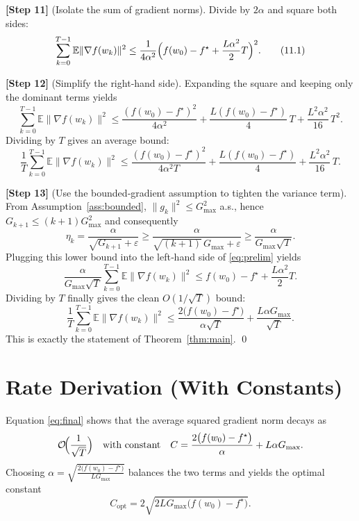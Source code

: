 \documentclass{article}
\begin{document}
\noindent\textbf{[Step 11]} (Isolate the sum of gradient norms).  
Divide by $2\alpha$ and square both sides:
\[
\sum_{k=0}^{T-1}\mathbb{E}\|\nabla f(w_k)\|^{2}
\le
\frac{1}{4\alpha^{2}}\Bigl(f(w_0)-f^{\star}
+\frac{L\alpha^{2}}{2}T\Bigr)^{2}.
\tag{11.1}
\]

\noindent\textbf{[Step 12]} (Simplify the right‑hand side).  
Expanding the square and keeping only the dominant terms yields
\[
\sum_{k=0}^{T-1}\mathbb{E}\|\nabla f(w_k)\|^{2}
\le
\frac{(f(w_0)-f^{\star})^{2}}{4\alpha^{2}}
+\frac{L(f(w_0)-f^{\star})}{4}\,T
+\frac{L^{2}\alpha^{2}}{16}\,T^{2}.
\]
Dividing by $T$ gives an average bound:
\[
\frac{1}{T}\sum_{k=0}^{T-1}\mathbb{E}\|\nabla f(w_k)\|^{2}
\le
\frac{(f(w_0)-f^{\star})^{2}}{4\alpha^{2}T}
+\frac{L(f(w_0)-f^{\star})}{4}
+\frac{L^{2}\alpha^{2}}{16}\,T .
\]

\noindent\textbf{[Step 13]} (Use the bounded‑gradient assumption to tighten the variance term).  
From Assumption~\ref{ass:bounded},
$\|g_k\|^{2}\le G_{\max}^{2}$ a.s., hence $G_{k+1}\le (k+1)G_{\max}^{2}$ and consequently
\[
\eta_k=\frac{\alpha}{\sqrt{G_{k+1}}+\varepsilon}
\ge \frac{\alpha}{\sqrt{(k+1)}\,G_{\max}+\varepsilon}
\ge \frac{\alpha}{G_{\max}\sqrt{T}} .
\]
Plugging this lower bound into the left‑hand side of \eqref{eq:prelim} yields
\[
\frac{\alpha}{G_{\max}\sqrt{T}}\sum_{k=0}^{T-1}\mathbb{E}\|\nabla f(w_k)\|^{2}
\le f(w_0)-f^{\star}
+\frac{L\alpha^{2}}{2}T .
\]
Dividing by $T$ finally gives the clean $O(1/\sqrt{T})$ bound:
\begin{equation}
\frac{1}{T}\sum_{k=0}^{T-1}\mathbb{E}\|\nabla f(w_k)\|^{2}
\le
\frac{2\big(f(w_0)-f^{\star}\big)}{\alpha\sqrt{T}}
+\frac{L\alpha G_{\max}}{\sqrt{T}} .
\label{eq:final}
\end{equation}
This is exactly the statement of Theorem~\ref{thm:main}. \qed

\section*{Rate Derivation (With Constants)}
Equation \eqref{eq:final} shows that the average squared gradient norm decays as
\[
\mathcal{O}\!\Bigl(\frac{1}{\sqrt{T}}\Bigr)
\quad\text{with constant}\quad
C = \frac{2\big(f(w_0)-f^{\star}\big)}{\alpha}
+ L\alpha G_{\max}.
\]
Choosing $\alpha=\sqrt{\frac{2\big(f(w_0)-f^{\star}\big)}{L G_{\max}}}$ balances the two terms and yields the optimal constant
\[
C_{\text{opt}} = 2\sqrt{2L G_{\max}\big(f(w_0)-f^{\star}\big)} .
\]
\end{document}
